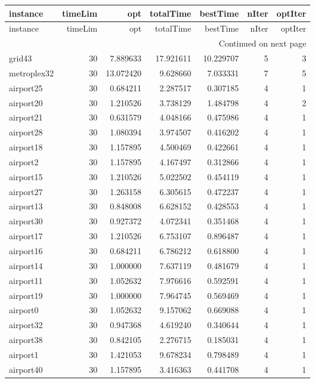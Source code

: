 
\begin{longtable}{|l|r|r|r|r|r|r|}
\toprule
instance & timeLim & opt & totalTime & bestTime & nIter & optIter \\
\midrule
\endfirsthead
\toprule
instance & timeLim & opt & totalTime & bestTime & nIter & optIter \\
\midrule
\endhead
\midrule
\multicolumn{7}{r}{Continued on next page} \\
\midrule
\endfoot
\bottomrule
\endlastfoot
grid43 & 30 & 7.889633 & 17.921611 & 10.229707 & 5 & 3 \\
metroplex32 & 30 & 13.072420 & 9.628660 & 7.033331 & 7 & 5 \\
airport25 & 30 & 0.684211 & 2.287517 & 0.307185 & 4 & 1 \\
airport20 & 30 & 1.210526 & 3.738129 & 1.484798 & 4 & 2 \\
airport21 & 30 & 0.631579 & 4.048166 & 0.475986 & 4 & 1 \\
airport28 & 30 & 1.080394 & 3.974507 & 0.416202 & 4 & 1 \\
airport18 & 30 & 1.157895 & 4.500469 & 0.422661 & 4 & 1 \\
airport2 & 30 & 1.157895 & 4.167497 & 0.312866 & 4 & 1 \\
airport15 & 30 & 1.210526 & 5.022502 & 0.454119 & 4 & 1 \\
airport27 & 30 & 1.263158 & 6.305615 & 0.472237 & 4 & 1 \\
airport13 & 30 & 0.848008 & 6.628152 & 0.428553 & 4 & 1 \\
airport30 & 30 & 0.927372 & 4.072341 & 0.351468 & 4 & 1 \\
airport17 & 30 & 1.210526 & 6.753107 & 0.896487 & 4 & 1 \\
airport16 & 30 & 0.684211 & 6.786212 & 0.618800 & 4 & 1 \\
airport14 & 30 & 1.000000 & 7.637119 & 0.481679 & 4 & 1 \\
airport11 & 30 & 1.052632 & 7.976616 & 0.592591 & 4 & 1 \\
airport19 & 30 & 1.000000 & 7.964745 & 0.569469 & 4 & 1 \\
airport0 & 30 & 1.052632 & 9.157062 & 0.669088 & 4 & 1 \\
airport32 & 30 & 0.947368 & 4.619240 & 0.340644 & 4 & 1 \\
airport38 & 30 & 0.842105 & 2.276715 & 0.185031 & 4 & 1 \\
airport1 & 30 & 1.421053 & 9.678234 & 0.798489 & 4 & 1 \\
airport40 & 30 & 1.157895 & 3.416363 & 0.441708 & 4 & 1 \\

\end{longtable}

